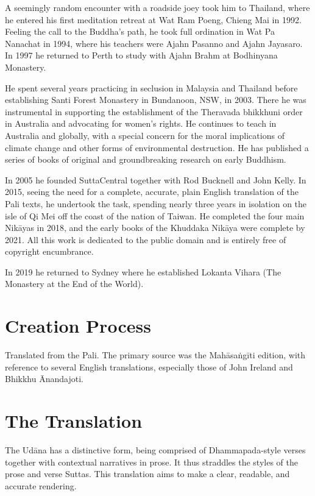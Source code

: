 \documentclass[12pt,openany]{book}%
\begin{document}
A seemingly random encounter with a roadside joey took him to Thailand, where he entered his first meditation retreat at Wat Ram Poeng, Chieng Mai in 1992. Feeling the call to the Buddha’s path, he took full ordination in Wat Pa Nanachat in 1994, where his teachers were Ajahn Pasanno and Ajahn Jayasaro. In 1997 he returned to Perth to study with Ajahn Brahm at Bodhinyana Monastery. 

He spent several years practicing in seclusion in Malaysia and Thailand before establishing Santi Forest Monastery in Bundanoon, NSW, in 2003. There he was instrumental in supporting the establishment of the Theravada bhikkhuni order in Australia and advocating for women’s rights. He continues to teach in Australia and globally, with a special concern for the moral implications of climate change and other forms of environmental destruction. He has published a series of books of original and groundbreaking research on early Buddhism. 

In 2005 he founded SuttaCentral together with Rod Bucknell and John Kelly. In 2015, seeing the need for a complete, accurate, plain English translation of the Pali texts, he undertook the task, spending nearly three years in isolation on the isle of Qi Mei off the coast of the nation of Taiwan. He completed the four main \textsanskrit{Nikāyas} in 2018, and the early books of the Khuddaka \textsanskrit{Nikāya} were complete by 2021. All this work is dedicated to the public domain and is entirely free of copyright encumbrance. 

In 2019 he returned to Sydney where he established Lokanta Vihara (The Monastery at the End of the World). 

\section*{Creation Process}

Translated from the Pali. The primary source was the \textsanskrit{Mahāsaṅgīti} edition, with reference to several English translations, especially those of John Ireland and Bhikkhu Ānandajoti.

\section*{The Translation}

The \textsanskrit{Udāna} has a distinctive form, being comprised of Dhammapada-style verses together with contextual narratives in prose. It thus straddles the styles of the prose and verse Suttas. This translation aims to make a clear, readable, and accurate rendering.
\end{document}
